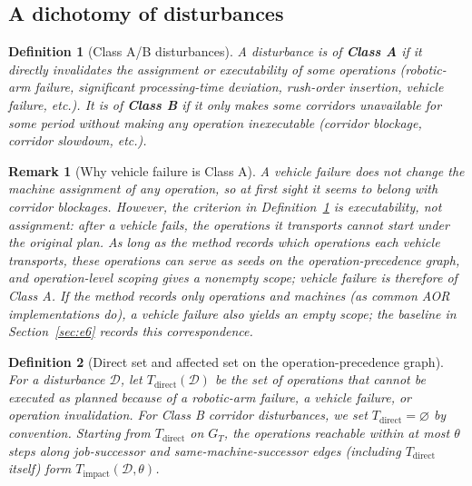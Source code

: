 \documentclass[manuscript,screen,review]{acmart}
\newtheorem{definition}{Definition}
\newtheorem{remark}{Remark}
\begin{document}
\subsection{A dichotomy of disturbances}
\label{sec:disturbance_classes}

\begin{definition}[Class A/B disturbances]
\label{def:ab}
A disturbance is of \textbf{Class A} if it directly invalidates the assignment or \emph{executability} of some operations (robotic-arm failure, significant processing-time deviation, rush-order insertion,
vehicle failure, etc.). It is of \textbf{Class B} if it only makes some corridors unavailable for some period without making any operation
inexecutable (corridor blockage, corridor slowdown, etc.).
\end{definition}

\begin{remark}[Why vehicle failure is Class A]
\label{rem:agv_class}
A vehicle failure does not change the machine assignment of any operation, so at first sight it seems to belong with corridor blockages. However, the criterion in Definition~\ref{def:ab} is
\emph{executability}, not assignment: after a vehicle fails, the operations it transports cannot start under the original plan.
As long as the method records which operations each vehicle transports, these operations can serve as seeds on the operation-precedence graph,
and operation-level scoping gives a nonempty scope; vehicle failure is therefore of Class A.
If the method records only operations and machines (as common AOR implementations do), a vehicle failure also yields an empty scope;
the baseline in Section~\ref{sec:e6} records this correspondence.
\end{remark}

\begin{definition}[Direct set and affected set on the operation-precedence graph]
\label{def:task_impact}
For a disturbance \(\mathcal{D}\), let \(T_{\mathrm{direct}}(\mathcal{D})\) be the set of operations that cannot be executed as planned because of a robotic-arm failure, a vehicle failure, or operation invalidation.
For Class B corridor disturbances, we set \(T_{\mathrm{direct}}=\varnothing\) by convention.
Starting from \(T_{\mathrm{direct}}\) on \(G_T\), the operations reachable within at most \(\theta\) steps along job-successor and same-machine-successor edges (including \(T_{\mathrm{direct}}\) itself) form
\(T_{\mathrm{impact}}(\mathcal{D},\theta)\).
\end{definition}
\end{document}
